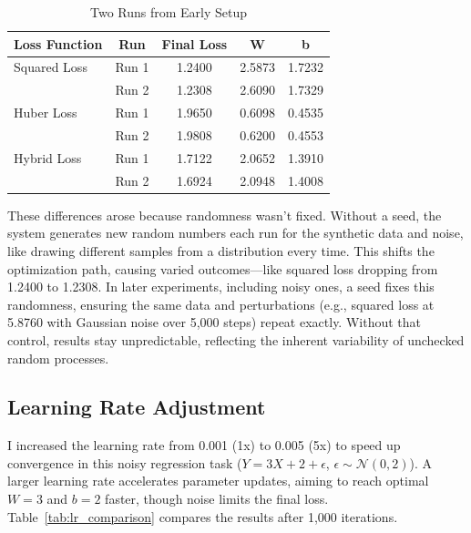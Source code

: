 \documentclass{article}
\begin{document}
\begin{table}[h]
    \centering
    \caption{Two Runs from Early Setup}
    \label{tab:run_comparison}
    \begin{tabular}{lcccc}
        \toprule
        \textbf{Loss Function} & \textbf{Run} & \textbf{Final Loss} & \textbf{W} & \textbf{b} \\
        \midrule
        Squared Loss & Run 1 & 1.2400 & 2.5873 & 1.7232 \\
                     & Run 2 & 1.2308 & 2.6090 & 1.7329 \\
        Huber Loss   & Run 1 & 1.9650 & 0.6098 & 0.4535 \\
                     & Run 2 & 1.9808 & 0.6200 & 0.4553 \\
        Hybrid Loss  & Run 1 & 1.7122 & 2.0652 & 1.3910 \\
                     & Run 2 & 1.6924 & 2.0948 & 1.4008 \\
        \bottomrule
    \end{tabular}
\end{table}

These differences arose because randomness wasn’t fixed. Without a seed, the system generates new random numbers each run for the synthetic data and noise, like drawing different samples from a distribution every time. This shifts the optimization path, causing varied outcomes—like squared loss dropping from 1.2400 to 1.2308. In later experiments, including noisy ones, a seed fixes this randomness, ensuring the same data and perturbations (e.g., squared loss at 5.8760 with Gaussian noise over 5,000 steps) repeat exactly. Without that control, results stay unpredictable, reflecting the inherent variability of unchecked random processes.

\subsection{Learning Rate Adjustment}

I increased the learning rate from 0.001 (1x) to 0.005 (5x) to speed up convergence in this noisy regression task (\( Y = 3X + 2 + \epsilon \), \( \epsilon \sim \mathcal{N}(0, 2) \)). A larger learning rate accelerates parameter updates, aiming to reach optimal \( W = 3 \) and \( b = 2 \) faster, though noise limits the final loss. Table~\ref{tab:lr_comparison} compares the results after 1,000 iterations.
\end{document}
